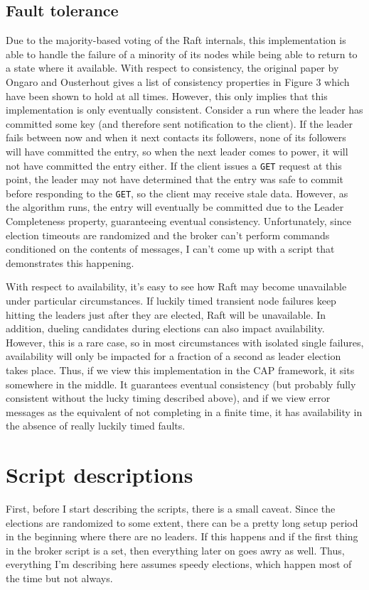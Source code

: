 \documentclass[psamsfonts]{amsart}
\begin{document}
\subsection{Fault tolerance}
Due to the majority-based voting of the Raft internals, this implementation is able to handle the failure of a minority of its nodes while being able to return to a state where it available. With respect to consistency, the original paper by Ongaro and Ousterhout gives a list of consistency properties in Figure 3 which have been shown to hold at all times. However, this only implies that this implementation is only eventually consistent. Consider a run where the leader has committed some key (and therefore sent notification to the client). If the leader fails between now and when it next contacts its followers, none of its followers will have committed the entry, so when the next leader comes to power, it will not have committed the entry either. If the client issues a \verb|GET| request at this point, the leader may not have determined that the entry was safe to commit before responding to the \verb|GET|, so the client may receive stale data. However, as the algorithm runs, the entry will eventually be committed due to the Leader Completeness property, guaranteeing eventual consistency. Unfortunately, since election timeouts are randomized and the broker can't perform commands conditioned on the contents of messages, I can't come up with a script that demonstrates this happening.

With respect to availability, it's easy to see how Raft may become unavailable under particular circumstances. If luckily timed transient node failures keep hitting the leaders just after they are elected, Raft will be unavailable. In addition, dueling candidates during elections can also impact availability. However, this is a rare case, so in most circumstances with isolated single failures, availability will only be impacted for a fraction of a second as leader election takes place. Thus, if we view this implementation in the CAP framework, it sits somewhere in the middle. It guarantees eventual consistency (but probably fully consistent without the lucky timing described above), and if we view error messages as the equivalent of not completing in a finite time, it has availability in the absence of really luckily timed faults.
\section{Script descriptions}
First, before I start describing the scripts, there is a small caveat. Since the elections are randomized to some extent, there can be a pretty long setup period in the beginning where there are no leaders. If this happens and if the first thing in the broker script is a set, then everything later on goes awry as well. Thus, everything I'm describing here assumes speedy elections, which happen most of the time but not always.
\end{document}
